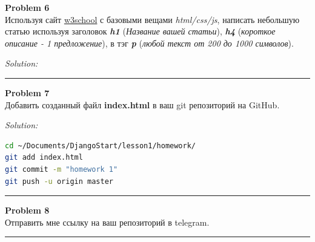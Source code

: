 \documentclass[a4paper, 11pt]{extarticle}
\newenvironment{problem}[2][Problem]
    { \begin{mdframed}[backgroundcolor=gray!20] \textbf{#1 #2} \\}
    {  \end{mdframed}}
\newenvironment{solution}
    {\textit{Solution:}}
    {}
\begin{document}
\begin{problem}{6}
Используя сайт \href{https://www.w3schools.com/html/default.asp}{w3school} с базовыми вещами \textit{html/css/js}, написать небольшую статью используя заголовок \textit{\textbf{h1}} (\textit{Название вашей статьи}), \textit{\textbf{h4}} (\textit{короткое описание - 1 предложение}), в тэг \textit{\textbf{p}} (\textit{любой текст от 200 до 1000 символов}). 
\end{problem}
\begin{solution}

\end{solution} 
\noindent\rule{6.257in}{2.8pt}



\begin{problem}{7}
Добавить созданный файл \textbf{index.html} в ваш git репозиторий на GitHub.
\end{problem}
\begin{solution}
\begin{lstlisting}[language=Bash,caption=Sample Bash code.]
cd ~/Documents/DjangoStart/lesson1/homework/
git add index.html
git commit -m "homework 1"
git push -u origin master
\end{lstlisting}
\end{solution} 
\noindent\rule{6.257in}{2.8pt}



\begin{problem}{8}
Отправить мне ссылку на ваш репозиторий в telegram.
\end{problem}

\noindent\rule{6.257in}{2.8pt}


\end{document}
